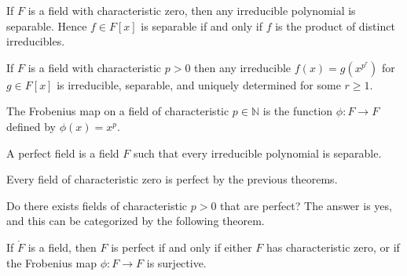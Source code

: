         \begin{theorem}
            If $F$ is a field with characteristic zero, then any irreducible
            polynomial is separable. Hence $f\in{F}[x]$ is separable if and
            only if $f$ is the product of distinct irreducibles.
        \end{theorem}
        \begin{theorem}
            If $F$ is a field with characteristic $p>0$ then any irreducible
            $f(x)=g(x^{p^{r}})$ for $g\in{F}[x]$ is irreducible, separable,
            and uniquely determined for some $r\geq{1}$.
        \end{theorem}
        \begin{definition}
            The Frobenius map on a field of characteristic $p\in\mathbb{N}$
            is the function $\phi:F\rightarrow{F}$ defined by
            $\phi(x)=x^{p}$.
        \end{definition}
        \begin{definition}
            A perfect field is a field $F$ such that every irreducible
            polynomial is separable.
        \end{definition}
        \begin{example}
            Every field of characteristic zero is perfect by the previous
            theorems.
        \end{example}
        Do there exists fields of characteristic $p>0$ that are perfect?
        The answer is yes, and this can be categorized by the following
        theorem.
        \begin{theorem}
            If $\ring{F}$ is a field, then $F$ is perfect if and only if
            either $F$ has characteristic zero, or if the Frobenius
            map $\phi:F\rightarrow{F}$ is surjective.
        \end{theorem}
